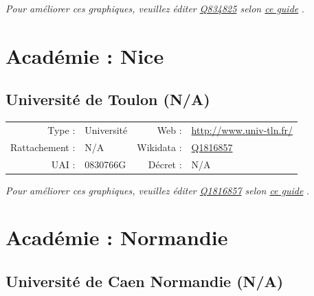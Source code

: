 \documentclass[11pt,french,landscape]{article}
\begin{document}
\textit{\scriptsize Pour améliorer ces graphiques, veuillez éditer \href{https://www.wikidata.org/entity/Q834825}{Q834825}  selon \href{https://github.com/cpesr/wikidataESR/blob/master/Rmd/wikidataESR.md}{ce guide}}
.


\newpage

\hypertarget{acaduxe9mie-nice}{%
\section{Académie : Nice}\label{acaduxe9mie-nice}}

\hypertarget{universituxe9-de-toulon-na}{%
\subsection{Université de Toulon
(N/A)}\label{universituxe9-de-toulon-na}}

\begin{tabular*}{0.45\textwidth}{rp{2cm}rl}  
\hline  
Type : & Université & Web : &\href{http://www.univ-tln.fr/}{http://www.univ-tln.fr/} \\  
Rattachement : & N/A & Wikidata : & \href{https://www.wikidata.org/entity/Q1816857}{Q1816857} \\  
UAI : & 0830766G & Décret : & N/A \\  
\hline  
\end{tabular*}

\textit{\scriptsize Pour améliorer ces graphiques, veuillez éditer \href{https://www.wikidata.org/entity/Q1816857}{Q1816857}  selon \href{https://github.com/cpesr/wikidataESR/blob/master/Rmd/wikidataESR.md}{ce guide}}
.


\newpage

\hypertarget{acaduxe9mie-normandie}{%
\section{Académie : Normandie}\label{acaduxe9mie-normandie}}

\hypertarget{universituxe9-de-caen-normandie-na}{%
\subsection{Université de Caen Normandie
(N/A)}\label{universituxe9-de-caen-normandie-na}}
\end{document}
